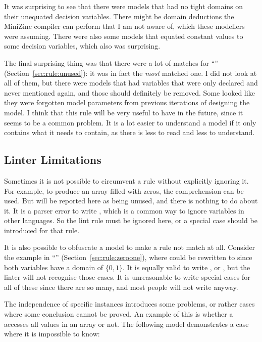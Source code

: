 \documentclass[a4paper,12pt]{article}
\newcommand{\ruleref}[1]{``\nameref{sec:rule:#1}'' (Section~\ref{sec:rule:#1})}
\begin{document}
It was surprising to see that there were models that had no tight domains on their
unequated decision variables.
There might be domain deductions the MiniZinc compiler can perform that I am not aware
of, which these modellers were assuming.
There were also some models that equated constant values to some decision variables, which also was surprising.

The final surprising thing was that there were a lot of matches for \ruleref{unused}:
it was in fact the \emph{most} matched one. I did not look at all of them, but
there were models that had variables that were only declared and never mentioned again,
and those should definitely be removed.
Some looked like they were forgotten model parameters from previous iterations of designing the model.
I think that this
rule will be very useful to have in the future, since it seems to be a common problem.
It is a lot easier to understand a model if it only contains
what it needs to contain, as there is less to read and less to understand.
 
\subsection{Linter Limitations}\label{sec:disc:lintlimits}
Sometimes it is not possible to circumvent a rule without explicitly ignoring it. For
example, to produce an array filled with zeros, the comprehension \mzninlinebar{[0 | i in 1..k]} can be
used. But  will be reported here as being unused, and there is nothing to do about
it. It is a parser error to write \mzninlinebar{[0 | \_ in 1..k]}, which is a common way to ignore variables in other languages.
So the lint rule must be
ignored here, or a special case should be introduced for that rule.

It is also possible to obfuscate a model to make a rule not match at all. Consider
the example in \ruleref{zeroone}, where
 could be rewritten to  since both variables have a domain of
$\{0,1\}$. It is equally valid to write , or ,
but the linter will not recognise those cases. It is unreasonable to write special cases for
all of these since there are so many, and most people will not write  anyway.

The independence of specific instances introduces some problems, or rather cases where
some conclusion cannot be proved.
An example of this is whether a 
accesses all values in an array or not. The following model demonstrates a case
where it is impossible to know:
\end{document}
